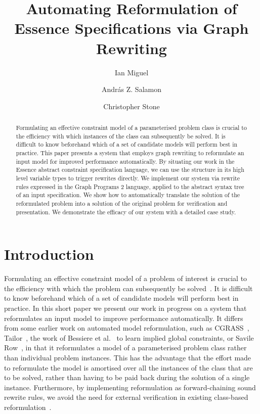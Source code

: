 \documentclass[anonymous,a4paper,UKenglish,cleveref,pdfa]{lipics-v2021}
\author{Ian Miguel}%
{School of Computer Science, University of St Andrews, UK}%
{ijm@st-andrews.ac.uk}%
{\orcidID{0000-0002-6930-2686}}%
{}%
\author{András Z. Salamon}%
{School of Computer Science, University of St Andrews, UK}%
{Andras.Salamon@st-andrews.ac.uk}%
{\orcidID{0000-0002-1415-9712}}%
{}%
\author{Christopher Stone}%
{School of Computer Science, University of St Andrews, UK}%
{cls29@st-andrews.ac.uk}%
{\orcidID{0000-0002-9512-9987}}%
{}%
\title{Automating Reformulation of Essence Specifications via Graph Rewriting
}
\begin{document}
\maketitle

\begin{abstract}

Formulating an effective constraint model of a parameterised problem class is crucial to the efficiency with which instances of the class can subsequently be solved. It is difficult to know beforehand which of a set of candidate models will perform best in practice. This paper presents a system that employs graph rewriting to reformulate an input model for improved performance automatically. By situating our work in the Essence abstract constraint specification language, we can use the structure in its high level variable types to trigger rewrites directly. We implement our system via rewrite rules expressed in the Graph Programs 2 language, applied to the abstract syntax tree of an input specification. We show how to automatically translate the solution of the reformulated problem into a solution of the original problem for verification and presentation. We demonstrate the efficacy of our system with a detailed case study.

\end{abstract}


\section{Introduction}

Formulating an effective constraint model of a problem of interest is crucial to the efficiency with which the problem can subsequently be solved~\cite{freuder2018:progress}. It is difficult to know beforehand which of a set of candidate models will perform best in practice. In this short paper we present our work in progress on a system that reformulates an input model to improve performance automatically. It differs from some earlier work on automated model reformulation, such as {\sc CGRASS}~\cite{frisch2002cgrass}, Tailor~\cite{gent2007tailoring}, the work of Bessiere et al.~\cite{Bessiere2007:learning} to learn implied global constraints, or Savile Row~\cite{savilerow}, in that it reformulates a model of a parameterised problem class rather than individual problem instances. This has the advantage that the effort made to reformulate the model is amortised over all the instances of the class that are to be solved, rather than having to be paid back during the solution of a single instance. Furthermore, by implementing reformulation as forward-chaining sound rewrite rules, we avoid the need for external verification in existing class-based reformulation~\cite{colton2001:constraint, charnley2006:automatic, leo2022globalizing}.
\end{document}
